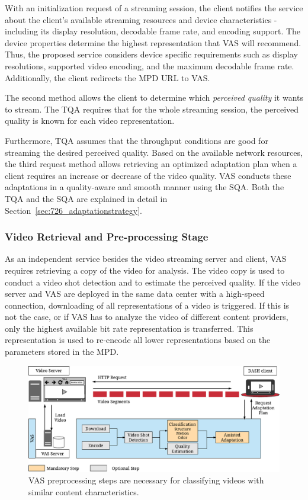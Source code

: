 With an initialization request of a streaming session, the client notifies the service about the client's available streaming resources and device characteristics - including its display resolution, decodable frame rate, and encoding support. 
The device properties determine the highest representation that \ac{VAS} will recommend.
Thus, the proposed service considers device specific requirements such as display resolutions, supported video encoding, and the maximum decodable frame rate.
Additionally, the client redirects the \ac{MPD} \ac{URL} to \ac{VAS}.

The second method allows the client to determine which \emph{perceived quality} it wants to stream.
The \acf{TQA} requires that for the whole streaming session, the perceived quality is known for each video representation.

Furthermore, \ac{TQA} assumes that the throughput conditions are good for streaming the desired perceived quality.
Based on the available network resources, the third request method allows retrieving an optimized adaptation plan when a client requires an increase or decrease of the video quality.
\ac{VAS} conducts these adaptations in a quality-aware and smooth manner using the \ac{SQA}.
Both the \ac{TQA} and the \ac{SQA} are explained in detail in Section~\ref{sec:726_adaptationstrategy}.
\subsubsection{Video Retrieval and Pre-processing Stage}
\label{sec:724_preprocessing}
As an independent service besides the video streaming server and client, \ac{VAS} requires retrieving a copy of the video for analysis. 
The video copy is used to conduct a video shot detection and to estimate the perceived quality.
If the video server and \ac{VAS} are deployed in the same data center with a high-speed connection, downloading of all representations of a video is triggered.
If this is not the case, or if \ac{VAS} has to analyze the video of different content providers, only the highest available bit rate representation is transferred. 
This representation is used to re-encode all lower representations based on the parameters stored in the \ac{MPD}.
\begin{figure}[!htb]
	\centering
	\includegraphics[width=\linewidth]{./gfx/700_VAS/preprocessing.pdf}
	\caption[VAS preprocessing steps]{VAS preprocessing steps are necessary for classifying videos with similar content characteristics.}
	\label{fig:720_preprocessing}
\end{figure}


